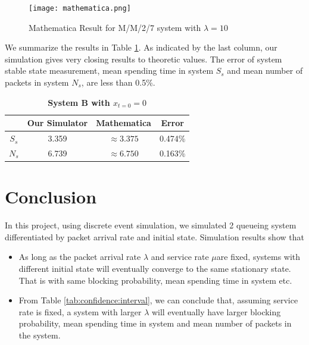 \documentclass[12pt]{article}  %
\theoremstyle{definition}
\theoremstyle{remark}
\begin{document}
\begin{figure}
\centering
\texttt{[image: mathematica.png]}
\caption{Mathematica Result for M/M/2/7 system with $\lambda=10$}
\label{fig:mathematica}
\end{figure}

We summarize the results in Table \ref{tab:err:compare}.
As indicated by the last column, our simulation gives very closing results to theoretic values.
The error of system stable state measurement, mean spending time in system $S_s$ and mean number of packets in system $N_s$, are less than 0.5\%.

\begin{table}
\centering
\caption{\textbf{System B with $x_{t=0}=0$}}
\begin{tabular}{cccc}
\hline
 & Our Simulator & Mathematica & Error \\
\hline
\hline
$S_s$ & 3.359 & $\approx 3.375$ & 0.474\% \\
\hline
$N_s$ & 6.739 & $\approx 6.750$ & 0.163\% \\
\hline
\end{tabular}
\label{tab:err:compare}
\end{table}

\section{Conclusion}
In this project, using discrete event simulation, we simulated 2 queueing system differentiated by packet arrival rate and initial state. Simulation results show that
\begin{itemize}
        \item As long as the packet arrival rate $\lambda$ and service rate $\mu$are fixed, systems with different initial state will eventually converge to the same stationary state.
                That is with same blocking probability, mean spending time in system etc.
        \item From Table \ref{tab:confidence:interval}, we can conclude that, assuming service rate is fixed, a system with larger $\lambda$ will eventually have larger blocking probability, mean spending time in system and mean number of packets in the system.
\end{itemize}


\appendix
\end{document}
